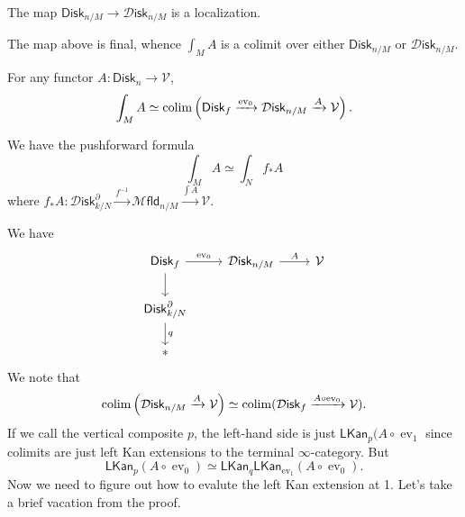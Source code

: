 \documentclass{amsart}
\DeclareMathOperator{\ev}{ev}
\newcommand{\disk}{\mathsf{Disk}_n}
\begin{document}
\begin{lemma}
    The map $\mathsf{Disk}_{n/M}\to\mathcal{D}\mathsf{isk}_{n/M}$ is a localization.
\end{lemma}
\begin{corollary}
    The map above is final, whence $\int_M A$ is a colimit over either
    $\mathsf{Disk}_{n/M}$ or $\mathcal{D}\mathsf{isk}_{n/M}$.
\end{corollary}
\begin{corollary}
    For any functor $A:\disk\to\mathcal{V}$,
    \begin{equation*}
        \int_M A \simeq \colim\left( \mathsf{Disk}_f\xrightarrow{\ev_0}\mathcal{D}\mathsf{isk}_{n/M}\xrightarrow{A} \mathcal{V} \right).
    \end{equation*}
\end{corollary}

\begin{theorem}
    We have the pushforward formula
    \begin{equation*}
        \int_M A \simeq \int_N f_*A
    \end{equation*}
    where $f_*A:\mathcal{D}\mathsf{isk}_{k/N}^\partial \xrightarrow{f^{-1}} \mathcal{M}\mathsf{fld}_{n/M}\xrightarrow{\int A}\mathcal{V}$.
\end{theorem}

We have
\begin{equation*}
    \begin{tikzcd}
        \mathsf{Disk}_f\dar\rar{\ev_0} &  \mathcal{D}\mathsf{isk}_{n/M}\rar{A} & \mathcal{V} \\
        \mathsf{Disk}^\partial_{k/N}\dar{q} \\
        *
    \end{tikzcd}
\end{equation*}
We note that
\begin{equation*}
    \colim \left( \mathcal{D}\mathsf{isk}_{n/M}\xrightarrow{A} \mathcal{V} \right)\simeq \colim (\mathcal{D}\mathsf{isk}_f\xrightarrow{A\circ\ev_0}\mathcal{V}).
\end{equation*}
If we call the vertical composite $p$, the left-hand side is just $\mathsf{LKan}_p(A\circ\ev_1$ since
colimits are just left Kan extensions to the terminal $\infty$-category. But
\begin{equation*}
    \mathsf{LKan}_p(A\circ\ev_0)\simeq \mathsf{LKan}_q\mathsf{LKan}_{\ev_1}(A\circ \ev_0).
\end{equation*}
Now we need to figure out how to evalute the left Kan extension at 1. Let's take a brief vacation from the proof.
\end{document}
